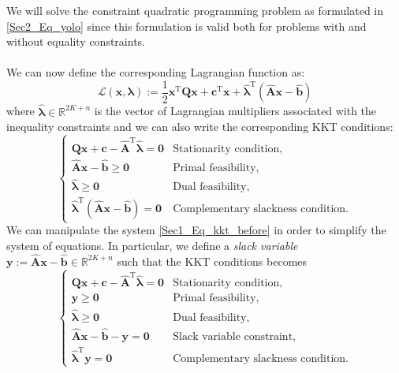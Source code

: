 We will solve the constraint quadratic programming problem as formulated in \ref{Sec2_Eq_yolo} since this formulation is valid both for problems with and without equality constraints.
\\
\\
We can now define the corresponding Lagrangian function as:
\begin{equation}
	\mathcal{L}(\bm{x}, \bm{\lambda}) := \frac{1}{2}\bm{x}^\mathrm{T}\mathbf{Q}\bm{x} + \bm{c}^\mathrm{T}\bm{x} + \hat{\bm{\lambda}}^\mathrm{T}(\hat{\mathbf{A}}\bm{x}-\hat{\bm{b}})
	\label{Sec1_Eq_lagrangian_B}
\end{equation}
where $\hat{\bm{\lambda}}\in\mathbb{R}^{2K+n}$ is the vector of Lagrangian multipliers associated with the inequality constraints and we can also write the corresponding KKT conditions:
\begin{equation} 
    \begin{cases} 
		\mathbf{Q}\bm{x} + \bm{c} - \hat{\mathbf{A}}^\mathrm{T}\hat{\bm{\lambda}} = \bm{0} &\text{Stationarity condition,} \\
		\hat{\mathbf{A}}\bm{x} - \hat{\bm{b}} \geq \bm{0} &\text{Primal feasibility,}\\
		\hat{\bm{\lambda}} \geq \bm{0} &\text{Dual feasibility,}\\
		\hat{\bm{\lambda}}^\mathrm{T}\left( \hat{\mathbf{A}}\bm{x} - \hat{\bm{b}}\right) = \bm{0} &\text{Complementary slackness condition.}
	\end{cases}
	\label{Sec1_Eq_kkt_before}
\end{equation}
We can manipulate the system \eqref{Sec1_Eq_kkt_before} in order to simplify the system of equations. In particular, we define a \textit{slack variable} $\bm{y} := \hat{\mathbf{A}}\bm{x} - \hat{\bm{b}} \in \mathbb{R}^{2K+n}$ such that the KKT conditions becomes
\begin{equation} 
    \begin{cases} 
		\mathbf{Q}\bm{x} + \bm{c} - \hat{\mathbf{A}}^\mathrm{T}\hat{\bm{\lambda}} = \bm{0} &\text{Stationarity condition,} \\
		\bm{y} \geq \bm{0} &\text{Primal feasibility,}\\
		\hat{\bm{\lambda}} \geq \bm{0} &\text{Dual feasibility,}\\
		\hat{\mathbf{A}}\bm{x} - \hat{\bm{b}} -\bm{y} = \bm{0} &\text{Slack variable constraint,}\\
		\hat{\bm{\lambda}}^\mathrm{T}\bm{y} = \bm{0} &\text{Complementary slackness condition.}
	\end{cases}
	\label{Sec1_Eq_kkt_after}
\end{equation}